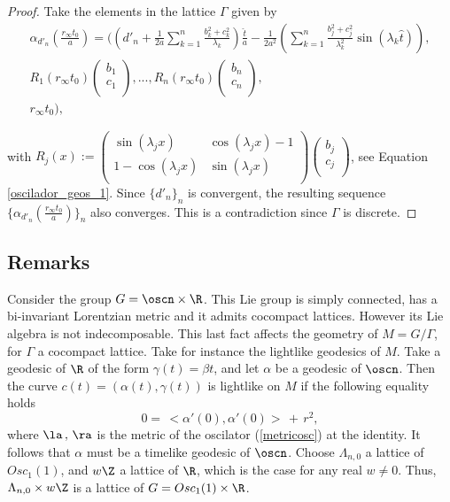 \documentclass[12pt]{amsart}
\theoremstyle{plain}
\theoremstyle{definition}
\theoremstyle{remark}
\begin{document}
\begin{proof}
			Take the elements in the lattice $\Gamma$ given by
			\begin{eqnarray*}
				\alpha_{d'_n}(\frac{r_{\infty} t_0}{a}) = ( (d'_n + \frac{1}{2 a} \sum_{k=1}^{n} \frac{ b_{k}^{2}+c_k^{2}}{\lambda_k})\frac{\hat{t}}{a}- \frac{1}{2 a^{2}} (  \sum_{k=1}^{n} \frac{b_{j}^{2}+c_j^2}{\lambda_k^{2}} \sin(\lambda_k \hat{t}) ), \\ 
				R_1(r_{\infty} t_0)\left( \begin{matrix}
					b_1 \\
					c_1 \\
				\end{matrix} \right),..., R_n(r_{\infty} t_0)\left( \begin{matrix}
					b_n \\
					c_n \\
				\end{matrix} \right), \\     
				r_\infty t_0 ),
			\end{eqnarray*}
			
			with $R_j(x) := \left( \begin{matrix}
				\sin{(\lambda_j x)} & \cos{(\lambda_j x)} -1 \\
				1 - \cos{(\lambda_j x)} & \sin{(\lambda_j x)} \\
			\end{matrix} \right)
			\left( \begin{matrix}
				b_j \\
				c_j \\
			\end{matrix} \right)$, see Equation \eqref{oscilador_geos_1}. Since $\{d'_n\}_n$ is convergent, the resulting sequence $\{ \alpha_{d'_n}(\frac{r_{\infty} t_0}{a}) \}_n$ also converges. This is a contradiction since $\Gamma$ is discrete.
			
		\end{proof}
		
		
		
	
	\subsection{Remarks}
	Consider the group $G=\oscn \times \R$. This Lie group is simply connected, has a bi-invariant Lorentzian metric and it admits cocompact lattices. However its Lie algebra is not indecomposable. This last fact affects the geometry of $M=G/\Gamma$, for $\Gamma$ a cocompact lattice. Take for instance the lightlike geodesics of $M$. Take a geodesic of $\R$ of the form $\gamma(t)=\beta t$, and let $\alpha$ be a geodesic of $\oscn$. Then the curve  $c(t)=(\alpha(t),\gamma(t))$ is lightlike on $M$ if the following equality holds
	\begin{equation}\label{remarkosc}
		0 = \, <\alpha'(0),\alpha'(0)> \, + \, r^2, 
	\end{equation}
	where $\la \,,\,\ra$ is the metric of the oscilator (\ref{metricosc}) at the identity. It follows that $\alpha$ must be a timelike geodesic of $\oscn$. Choose $\Lambda_{n,0}$  a lattice of $Osc_1(1)$, and $w \Z$ a lattice of $\R$, which is the case for any real $w \neq 0$. Thus,  $\Lambda_{n,0} \times w \Z$ is a lattice of $G=Osc_1(1) \times \R$.
	
\end{document}
